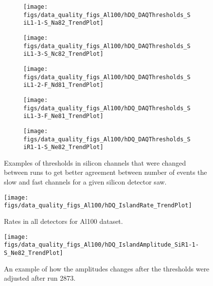 \documentclass[a4paper]{article}
\begin{document}
\begin{figure}
  \centering
  \begin{subfigure}{0.5\textwidth}
    \texttt{[image: figs/data\_quality\_figs\_Al100/hDQ\_DAQThresholds\_SiL1-1-S\_Na82\_TrendPlot]}
    \caption{}\label{fig:al100_sil11s_thresh}
  \end{subfigure}%
  \begin{subfigure}{0.5\textwidth}
    \texttt{[image: figs/data\_quality\_figs\_Al100/hDQ\_DAQThresholds\_SiL1-3-S\_Nc82\_TrendPlot]}
    \caption{}\label{fig:al100_sil13s_thresh}
  \end{subfigure}
  \begin{subfigure}{0.5\textwidth}
    \texttt{[image: figs/data\_quality\_figs\_Al100/hDQ\_DAQThresholds\_SiL1-2-F\_Nd81\_TrendPlot]}
    \caption{}\label{fig:al100_sil12f_thresh}
  \end{subfigure}%
  \begin{subfigure}{0.5\textwidth}
    \texttt{[image: figs/data\_quality\_figs\_Al100/hDQ\_DAQThresholds\_SiL1-3-F\_Ne81\_TrendPlot]}
    \caption{}\label{fig:al100_sil13f_thresh}
  \end{subfigure}
  \begin{subfigure}{0.5\textwidth}
    \texttt{[image: figs/data\_quality\_figs\_Al100/hDQ\_DAQThresholds\_SiR1-1-S\_Ne82\_TrendPlot]}
    \caption{}\label{fig:al100_sir11s_thresh}
  \end{subfigure}
  \caption{Examples of thresholds in silicon channels that were changed between runs to
    get better agreement between number of events the slow and fast channels for a given
    silicon detector saw.}
  \label{fig:al100_thresholds_change}
\end{figure}

\begin{figure}
  \centering
  \texttt{[image: figs/data\_quality\_figs\_Al100/hDQ\_IslandRate\_TrendPlot]}
  \caption{Rates in all detectors for Al100 dataset.}
  \label{fig:al100_rates}
\end{figure}

\begin{figure}
  \centering
  \texttt{[image: figs/data\_quality\_figs\_Al100/hDQ\_IslandAmplitude\_SiR1-1-S\_Ne82\_TrendPlot]}
  \caption{An example of how the amplitudes changes after the thresholds
    were adjusted after run 2873.}
  \label{fig:al100_sir11s_amps}
\end{figure}
\end{document}
